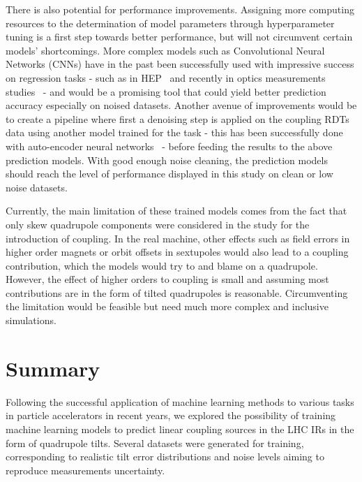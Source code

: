 There is also potential for performance improvements.
Assigning more computing resources to the determination of model parameters through hyperparameter tuning is a first step towards better performance, but will not circumvent certain models' shortcomings.
More complex models such as Convolutional Neural Networks (CNNs) have in the past been successfully used with impressive success on regression tasks - such as in \acrshort{HEP}~\cite{JOI:Aurisano:Convolutional_Neural_Network_Neutrino_Event_Classifier} and recently in optics measurements studies~\cite{IPAC:Fol:Optics_Corrections_Using_Machine_Learning_in_the_LHC} - and would be a promising tool that could yield better prediction accuracy especially on noised datasets.
Another avenue of improvements would be to create a pipeline where first a denoising step is applied on the coupling RDTs data using another model trained for the task - this has been successfully done with auto-encoder neural networks~\cite{IPAC:Fol:Denoising_Optics_Measurements_Autoencoder_Neural_Networks} - before feeding the results to the above prediction models.
With good enough noise cleaning, the prediction models should reach the level of performance displayed in this study on clean or low noise datasets.

Currently, the main limitation of these trained models comes from the fact that only skew quadrupole components were considered in the study for the introduction of coupling.
In the real machine, other effects such as field errors in higher order magnets or orbit offsets in sextupoles would also lead to a coupling contribution, which the models would try to and blame on a quadrupole.
However, the effect of higher orders to coupling is small and assuming most contributions are in the form of tilted quadrupoles is reasonable.
Circumventing the limitation would be feasible but need much more complex and inclusive simulations.

\section{Summary}
\label{section:ml_conclusions_outlooks}

Following the successful application of machine learning methods to various tasks in particle accelerators in recent years, we explored the possibility of training machine learning models to predict linear coupling sources in the \gls{LHC} \glspl{IR} in the form of quadrupole tilts.
Several datasets were generated for training, corresponding to realistic tilt error distributions and noise levels aiming to reproduce measurements uncertainty.

